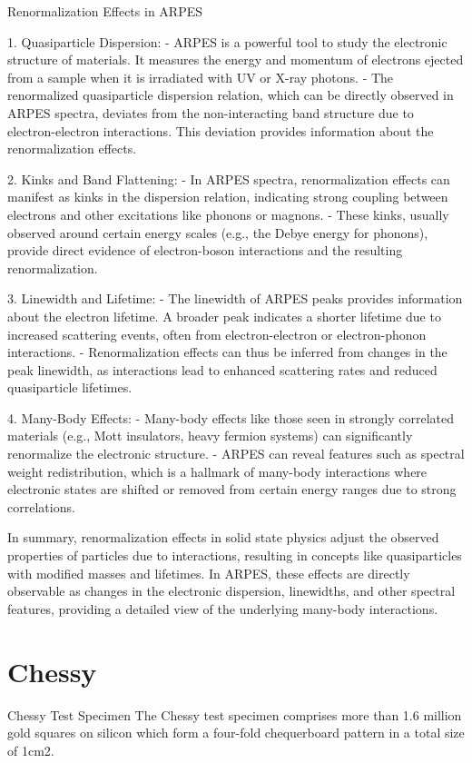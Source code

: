 Renormalization Effects in ARPES

1. Quasiparticle Dispersion:
- ARPES is a powerful tool to study the electronic structure of materials. It measures the energy and momentum of electrons ejected from a sample when it is irradiated with UV or X-ray photons.
- The renormalized quasiparticle dispersion relation, which can be directly observed in ARPES spectra, deviates from the non-interacting band structure due to electron-electron interactions. This deviation provides information about the renormalization effects.

2. Kinks and Band Flattening:
- In ARPES spectra, renormalization effects can manifest as kinks in the dispersion relation, indicating strong coupling between electrons and other excitations like phonons or magnons.
- These kinks, usually observed around certain energy scales (e.g., the Debye energy for phonons), provide direct evidence of electron-boson interactions and the resulting renormalization.

3. Linewidth and Lifetime:
- The linewidth of ARPES peaks provides information about the electron lifetime. A broader peak indicates a shorter lifetime due to increased scattering events, often from electron-electron or electron-phonon interactions.
- Renormalization effects can thus be inferred from changes in the peak linewidth, as interactions lead to enhanced scattering rates and reduced quasiparticle lifetimes.

4. Many-Body Effects:
- Many-body effects like those seen in strongly correlated materials (e.g., Mott insulators, heavy fermion systems) can significantly renormalize the electronic structure.
- ARPES can reveal features such as spectral weight redistribution, which is a hallmark of many-body interactions where electronic states are shifted or removed from certain energy ranges due to strong correlations.

In summary, renormalization effects in solid state physics adjust the observed properties of particles due to interactions, resulting in concepts like quasiparticles with modified masses and lifetimes. In ARPES, these effects are directly observable as changes in the electronic dispersion, linewidths, and other spectral features, providing a detailed view of the underlying many-body interactions.

\section{Chessy}
Chessy Test Specimen
The Chessy test specimen comprises more than 1.6 million gold squares on silicon which form a four-fold chequerboard pattern in a total size of 1cm2.